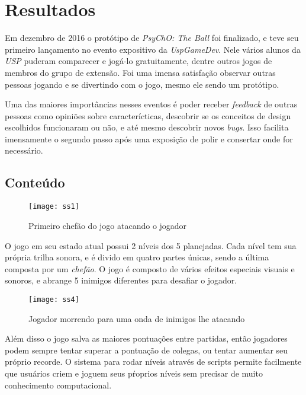 \chapter{Resultados}
\label{cap:resultados}

Em dezembro de 2016 o protótipo de \textit{PsyChO: The Ball} foi finalizado, e teve seu primeiro lançamento no evento expositivo da \textit{UspGameDev}. Nele vários alunos da \textit{USP} puderam comparecer e jogá-lo gratuitamente, dentre outros jogos de membros do grupo de extensão. Foi uma imensa satisfação observar outras pessoas jogando e se divertindo com o jogo, mesmo ele sendo um protótipo.

Uma das maiores importâncias nesses eventos é poder receber \textit{feedback} de outras pessoas como opiniões sobre caracterícticas, descobrir se os conceitos de design escolhidos funcionaram ou não, e até mesmo descobrir novos \textit{bugs}. Isso facilita imensamente o segundo passo após uma exposição de polir e consertar onde for necessário.

\section{Conteúdo}
\label{sec:conteudo}

\begin{figure}[h!]
\texttt{[image: ss1]}
\centering
\caption{Primeiro chefão do jogo atacando o jogador}
\end{figure}

O jogo em seu estado atual possui 2 níveis dos 5 planejadas. Cada nível tem sua própria trilha sonora, e é divido em quatro partes únicas, sendo a última composta por um \textit{chefão}. O jogo é composto de vários efeitos especiais visuais e sonoros, e abrange 5 inimigos diferentes para desafiar o jogador.\\

\begin{figure}[h!]
\texttt{[image: ss4]}
\centering
\caption{Jogador morrendo para uma onda de inimigos lhe atacando}
\end{figure}

Além disso o jogo salva as maiores pontuações entre partidas, então jogadores podem sempre tentar superar a pontuação de colegas, ou tentar aumentar seu próprio recorde.
O sistema para rodar níveis através de scripts permite facilmente que usuários criem e joguem seus pŕoprios níveis sem precisar de muito conhecimento computacional.

